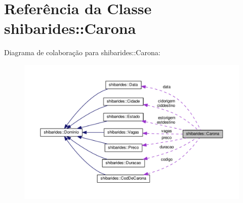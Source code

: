 \hypertarget{classshibarides_1_1Carona}{}\section{Referência da Classe shibarides\+:\+:Carona}
\label{classshibarides_1_1Carona}


Diagrama de colaboração para shibarides\+:\+:Carona\+:\nopagebreak
\begin{figure}[H]
\begin{center}
\leavevmode
\includegraphics[width=350pt]{classshibarides_1_1Carona__coll__graph}
\end{center}
\end{figure}
